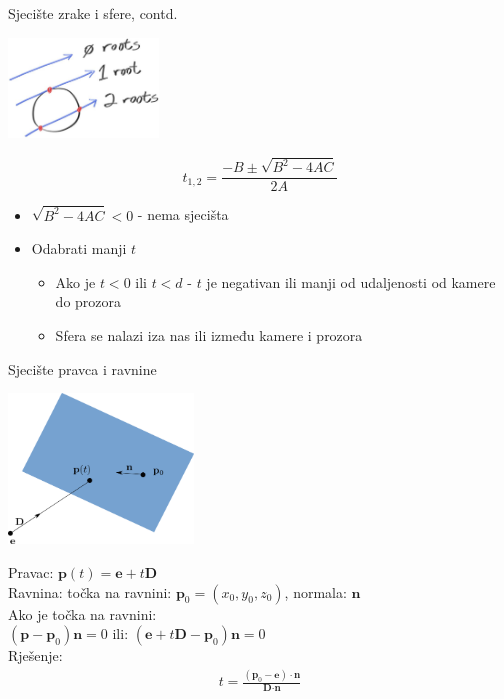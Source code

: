 \documentclass[9pt]{beamer}
\begin{document}
\begin{frame}{Sjecište zrake i sfere, contd.}
	\begin{center}
		\includegraphics[width=4cm]{slike/fig-1.04-ray-sphere.jpg}
	\end{center}
$$t_{1,2} = \frac{-B \pm \sqrt{B^2-4AC}}{2A}$$

\begin{itemize}
	\item $\sqrt{B^2-4AC} < 0$ - nema sjecišta
	\item Odabrati manji $t$
	\begin{itemize}
		\item  Ako je $t < 0$ ili $t < d$ - $t$ je negativan ili manji od udaljenosti od kamere do prozora
		\item Sfera se nalazi iza nas ili između kamere i prozora
	\end{itemize}
\end{itemize}

\end{frame}		
\begin{frame}{Sjecište pravca i ravnine}
	\begin{center}
		\includegraphics[height=4cm]{./slike/sjeciste_ravnina_pravac_01.png}
	\end{center}
	Pravac: $\textbf{p}(t) = \textbf{e}+t\textbf{D}$
	\\Ravnina: točka na ravnini: $\textbf{p}_0 = (x_0, y_0, z_0)$, normala: $\textbf{n}$
	\\Ako je točka na ravnini:\\
	$(\textbf{p} - \textbf{p}_0)\textbf{n}=0$
	ili:
	$(\textbf{e} +t\textbf{D}- \textbf{p}_0)\textbf{n}=0$
	\\Rješenje: 
	\begin{align*}
	t = \frac{(\textbf{p}_0-\textbf{e})\cdot\textbf{n}}{\textbf{D}\cdot\textbf{n}}
	\end{align*}
\end{frame}
\end{document}
